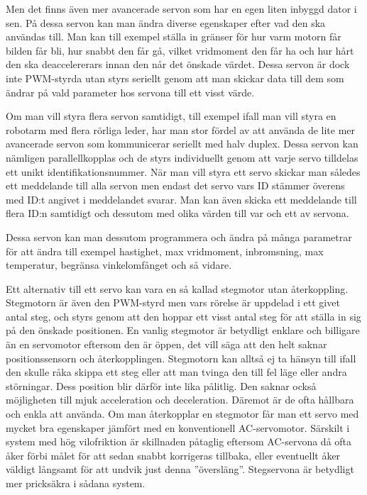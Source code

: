 \documentclass[a4paper,12pt]{article}
\begin{document}
Men det finns även mer avancerade servon som har en egen liten inbyggd dator i sen. På dessa servon kan man ändra diverse egenskaper efter vad den ska användas till. Man kan till exempel ställa in gränser för hur varm motorn får bilden får bli, hur snabbt den får gå, vilket vridmoment den får ha och hur hårt den ska deaccelererars innan den når det önskade värdet. Dessa servon är dock inte PWM-styrda utan styrs seriellt genom att man skickar data till dem som ändrar på vald parameter hos servona till ett visst värde. 
 
Om man vill styra flera servon samtidigt, till exempel ifall man vill styra en robotarm med flera rörliga leder, har man stor fördel av att använda de lite mer avancerade servon som kommunicerar seriellt med halv duplex. Dessa servon kan nämligen parallellkopplas och de styrs individuellt genom att varje servo tilldelas ett unikt identifikationsnummer. När man vill styra ett servo skickar man således ett meddelande till alla servon men endast det servo vars ID stämmer överens med ID:t angivet i meddelandet svarar. Man kan även skicka ett meddelande till flera ID:n samtidigt och dessutom med olika värden till var och ett av servona. 
 
Dessa servon kan man dessutom programmera och ändra på många parametrar för att ändra till exempel hastighet, max vridmoment, inbromsning, max temperatur, begränsa vinkelomfånget och så vidare.
 
Ett alternativ till ett servo kan vara en så kallad stegmotor utan återkoppling. Stegmotorn är även den PWM-styrd men vars rörelse är uppdelad i ett givet antal steg, och styrs genom att den hoppar ett visst antal steg för att ställa in sig på den önskade positionen. En vanlig stegmotor är betydligt enklare och billigare än en servomotor eftersom den är öppen, det vill säga att den helt saknar positionssensorn och återkopplingen. Stegmotorn kan alltså ej ta hänsyn till ifall den skulle råka skippa ett steg eller att man tvinga den till fel läge eller andra störningar. Dess position blir därför inte lika pålitlig. Den saknar också möjligheten till mjuk acceleration och deceleration. Däremot är de ofta hållbara och enkla att använda. Om man återkopplar en stegmotor får man ett servo med mycket bra egenskaper jämfört med en konventionell AC-servomotor.  Särskilt i system med hög vilofriktion är skillnaden påtaglig eftersom AC-servona då ofta åker förbi målet för att sedan snabbt korrigeras tillbaka, eller eventuellt åker väldigt långsamt för att undvik just denna ”översläng”. Stegservona är betydligt mer pricksäkra i sådana system. 
 
\end{document}
